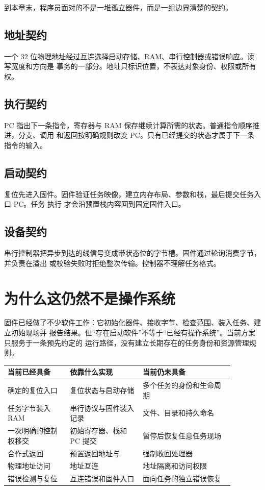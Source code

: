 到本章末，程序员面对的不是一堆孤立器件，而是一组边界清楚的契约。

\subsection{地址契约}

一个 32 位物理地址经过互连选择启动存储、RAM、串行控制器或错误响应。读写宽度和方向是
事务的一部分。地址只标识位置，不表达对象身份、权限或所有权。

\subsection{执行契约}

PC 指出下一条指令，寄存器与 RAM 保存继续计算所需的状态。普通指令顺序推进，分支、调用
和返回按明确规则改变 PC。只有已经提交的状态才属于下一条指令的输入。

\subsection{启动契约}

复位先进入固件。固件验证任务映像，建立内存布局、参数和栈，最后提交任务入口 PC。任务
执行  才会沿预置栈内容回到固定固件入口。

\subsection{设备契约}

串行控制器把异步到达的线信号变成带状态位的字节槽。固件通过轮询消费字节，并负责在溢出
或校验失败时拒绝整次传输。控制器不理解任务格式。

\section{为什么这仍然不是操作系统}

固件已经做了不少软件工作：它初始化器件、接收字节、检查范围、装入任务、建立初始现场并
报告结果。但“存在启动软件”不等于“已经有操作系统”。当前方案只服务于一条预先约定的
运行路径，没有建立长期存在的任务身份和资源管理规则。

\begin{longtable}{|L{0.24\linewidth}|L{0.29\linewidth}|L{0.35\linewidth}|}
\hline
{}
当前已经具备 & 依靠什么实现 & 当前仍未具备 \\ \hline
确定的复位入口 & 复位状态与启动存储 & 多个任务的身份和生命周期 \\ \hline
任务字节装入 RAM & 串行协议与固件装入记录 & 文件、目录和持久命名 \\ \hline
一次明确的控制权移交 & 初始寄存器、栈和 PC 提交 & 暂停后恢复任意任务现场 \\ \hline
合作式返回 & 预置返回地址与  & 强制收回处理器 \\ \hline
物理地址访问 & 地址互连 & 地址隔离和访问权限 \\ \hline
错误检测与复位 & 互连错误和固件入口 & 面向任务的独立错误恢复 \\ \hline
\end{longtable}

